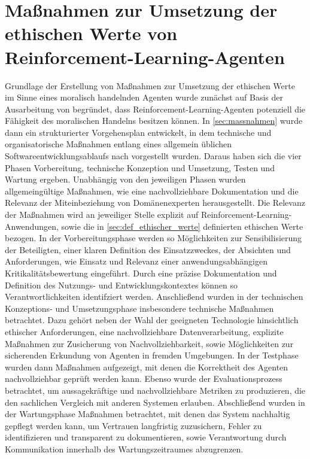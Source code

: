 \section{Maßnahmen zur Umsetzung der ethischen Werte von Reinforcement-Learning-Agenten}
Grundlage der Erstellung von Maßnahmen zur Umsetzung der ethischen Werte im Sinne eines moralisch handelnden Agenten wurde zunächst auf Basis der Ausarbeitung von \cite{bendel2019} begründet, dass Reinforcement-Learning-Agenten potenziell die Fähigkeit des moralischen Handelns besitzen können.
In \autoref{sec:massnahmen} wurde dann ein strukturierter Vorgehensplan entwickelt, in dem technische und organisatorische Maßnahmen entlang eines allgemein üblichen Softwareentwicklungsablaufs nach \cite{broy2013} vorgestellt wurden.
Daraus haben sich die vier Phasen Vorbereitung, technische Konzeption und Umsetzung, Testen und Wartung ergeben.
Unabhängig von den jeweiligen Phasen wurden allgemeingültige Maßnahmen, wie eine nachvollziehbare Dokumentation und die Relevanz der Miteinbeziehung von Domänenexperten herausgestellt.
Die Relevanz der Maßnahmen wird an jeweiliger Stelle explizit auf Reinforcement-Learning-Anwendungen, sowie die in \autoref{sec:def_ethischer_werte} definierten ethischen Werte bezogen.
In der Vorbereitungsphase werden so Möglichkeiten zur Sensibilisierung der Beteiligten, einer klaren Definition des Einsatzzweckes, der Absichten und Anforderungen, wie Einsatz und Relevanz einer anwendungsabhängigen Kritikalitätsbewertung eingeführt.
Durch eine präzise Dokumentation und Definition des Nutzungs- und Entwicklungskontextes können so Verantwortlichkeiten identifziert werden.
Anschließend wurden in der technischen Konzeptions- und Umsetzungsphase insbesondere technische Maßnahmen betrachtet.
Dazu gehört neben der Wahl der geeigneten Technologie hinsichtlich ethischer Anforderungen, eine nachvollziehbare Datenverarbeitung, explizite Maßnahmen zur Zusicherung von Nachvollziehbarkeit, sowie Möglichkeiten zur sicherenden Erkundung von Agenten in fremden Umgebungen.
In der Testphase wurden dann Maßnahmen aufgezeigt, mit denen die Korrektheit des Agenten nachvollziehbar geprüft werden kann.
Ebenso wurde der Evaluationsprozess betrachtet, um aussagekräftige und nachvollziehbare Metriken zu produzieren, die den sachlichen Vergleich mit anderen Systemen erlauben.
Abschließend wurden in der Wartungsphase Maßnahmen betrachtet, mit denen das System nachhaltig gepflegt werden kann, um Vertrauen langfristig zuzusichern, Fehler zu identifizieren und transparent zu dokumentieren, sowie Verantwortung durch Kommunikation innerhalb des Wartungszeitraumes abzugrenzen.

